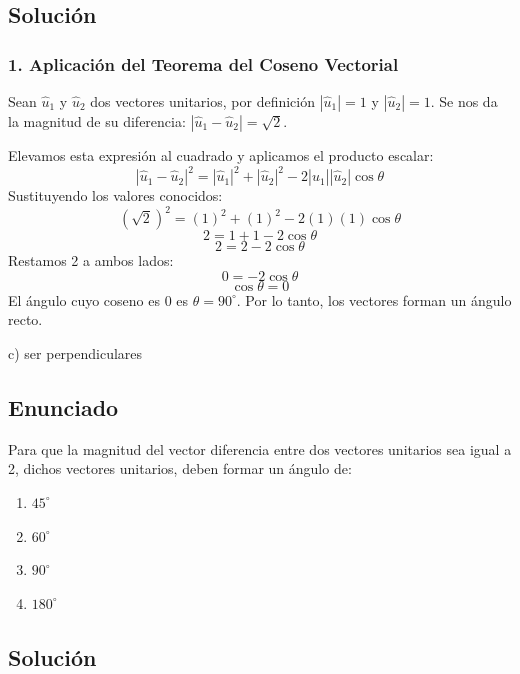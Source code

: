 \documentclass[12pt, a4paper]{article}
\begin{document}
\subsection*{Solución}

\subsubsection*{1. Aplicación del Teorema del Coseno Vectorial}
Sean $\hat{u}_1$ y $\hat{u}_2$ dos vectores unitarios, por definición $|\hat{u}_1| = 1$ y $|\hat{u}_2| = 1$.
Se nos da la magnitud de su diferencia: $|\hat{u}_1 - \hat{u}_2| = \sqrt{2}$.

Elevamos esta expresión al cuadrado y aplicamos el producto escalar:
$$ |\hat{u}_1 - \hat{u}_2|^2 = |\hat{u}_1|^2 + |\hat{u}_2|^2 - 2|\hat{u}_1||\hat{u}_2| \cos\theta $$
Sustituyendo los valores conocidos:
$$ (\sqrt{2})^2 = (1)^2 + (1)^2 - 2(1)(1)\cos\theta $$
$$ 2 = 1 + 1 - 2\cos\theta $$
$$ 2 = 2 - 2\cos\theta $$
Restamos 2 a ambos lados:
$$ 0 = -2\cos\theta $$
$$ \cos\theta = 0 $$
El ángulo cuyo coseno es $0$ es $\theta = 90^\circ$. Por lo tanto, los vectores forman un ángulo recto.

\begin{tcolorbox}[colback=green!5!white, colframe=green!50!black, title=Respuesta Final]
\centering \Large c) ser perpendiculares
\end{tcolorbox}

\newpage


\subsection*{Enunciado}
Para que la magnitud del vector diferencia entre dos vectores unitarios sea igual a 2, dichos vectores unitarios, deben formar un ángulo de:
\begin{enumerate}[label=\alph*)]
    \item $45^\circ$
    \item $60^\circ$
    \item $90^\circ$
    \item $180^\circ$
\end{enumerate}

\subsection*{Solución}
\end{document}
